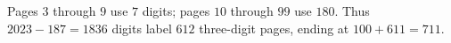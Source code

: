 Pages $3$ through $9$ use $7$ digits; pages $10$ through $99$ use $180$. Thus $2023-187=1836$ digits label $612$ three-digit pages, ending at $100+611=\boxed{711}$.
